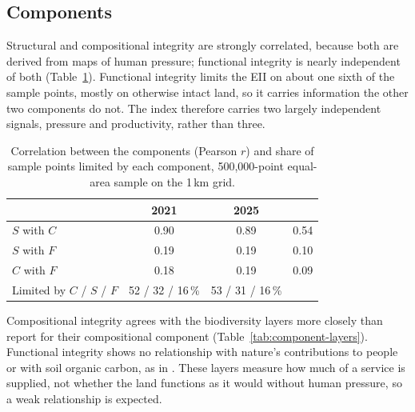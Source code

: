 \documentclass[11pt,a4paper]{article}
\begin{document}
\subsection{Components}
\label{sec:components-validation}

Structural and compositional integrity are strongly correlated, because both are derived from
maps of human pressure; functional integrity is nearly independent of both
(Table~\ref{tab:components}). Functional integrity limits the EII on about one sixth of the
sample points, mostly on otherwise intact land, so it carries information the other two
components do not. The index therefore carries two largely independent signals, pressure and
productivity, rather than three.

\begin{table}[H]
\centering\small
\caption{Correlation between the components (Pearson $r$) and share of sample points limited by
each component, 500,000-point equal-area sample on the 1\,km grid.}
\label{tab:components}
\begin{tabular}{lccc}
\toprule
 & 2021 & 2025 & \citet{hill2026} \\
\midrule
$S$ with $C$ & 0.90 & 0.89 & 0.54 \\
$S$ with $F$ & 0.19 & 0.19 & 0.10 \\
$C$ with $F$ & 0.18 & 0.19 & 0.09 \\
Limited by $C$ / $S$ / $F$ & 52 / 32 / 16\,\% & 53 / 31 / 16\,\% & \\
\bottomrule
\end{tabular}
\end{table}

Compositional integrity agrees with the biodiversity layers more closely than \citet{hill2026}
report for their compositional component (Table~\ref{tab:component-layers}). Functional integrity shows no
relationship with nature's contributions to people or with soil organic carbon, as in
\citet{hill2026}. These layers measure how much of a service is supplied, not whether the land
functions as it would without human pressure, so a weak relationship is expected.
\end{document}
